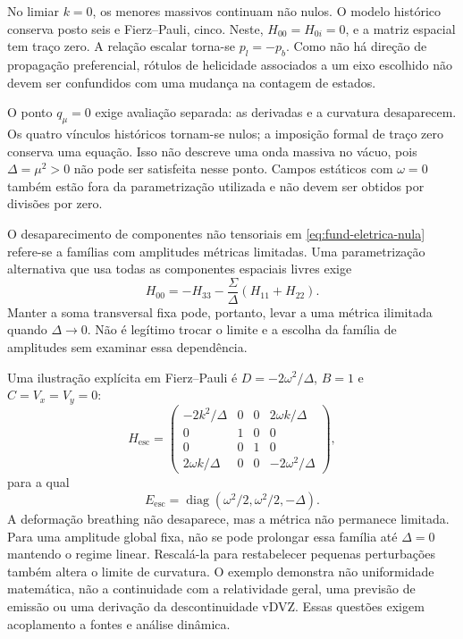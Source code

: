 No limiar \(k=0\), os menores massivos continuam não nulos. O
modelo histórico conserva posto seis e Fierz--Pauli, cinco. Neste,
\(H_{00}=H_{0i}=0\), e a matriz espacial tem traço zero. A relação
escalar torna-se \(p_l=-p_b\). Como não há direção de propagação
preferencial, rótulos de helicidade associados a um eixo escolhido não
devem ser confundidos com uma mudança na contagem de estados.

O ponto \(q_\mu=0\) exige avaliação separada: as derivadas e a
curvatura desaparecem. Os quatro vínculos históricos tornam-se
nulos; a imposição formal de traço zero conserva uma equação. Isso
não descreve uma onda massiva no vácuo, pois
\(\Delta=\mu^2>0\) não pode ser satisfeita nesse ponto. Campos
estáticos com \(\omega=0\) também estão fora da parametrização
utilizada e não devem ser obtidos por divisões por zero.

O desaparecimento de componentes não tensoriais em
\eqref{eq:fund-eletrica-nula} refere-se a famílias com amplitudes
métricas limitadas. Uma parametrização alternativa que usa todas as
componentes espaciais livres exige
\begin{equation}
 H_{00}=-H_{33}-\frac{\Sigma}{\Delta}(H_{11}+H_{22}).
 \label{eq:fund-parametrizacao-singular}
\end{equation}
Manter a soma transversal fixa pode, portanto, levar a uma métrica
ilimitada quando \(\Delta\to0\). Não é legítimo trocar o limite
e a escolha da família de amplitudes sem examinar essa dependência.

Uma ilustração explícita em Fierz--Pauli é
\(D=-2\omega^2/\Delta\), \(B=1\) e \(C=V_x=V_y=0\):
\begin{equation}
 H_{\mathrm{esc}}=\begin{pmatrix}
 -2k^2/\Delta&0&0&2\omega k/\Delta\\
 0&1&0&0\\
 0&0&1&0\\
 2\omega k/\Delta&0&0&-2\omega^2/\Delta
 \end{pmatrix},
 \label{eq:fund-familia-singular}
\end{equation}
para a qual
\begin{equation}
 E_{\mathrm{esc}}=\operatorname{diag}
       (\omega^2/2,\omega^2/2,-\Delta).
 \label{eq:fund-familia-curvatura}
\end{equation}
A deformação breathing não desaparece, mas a métrica não permanece
limitada. Para uma amplitude global fixa, não se pode prolongar essa
família até \(\Delta=0\) mantendo o regime linear. Rescalá-la para
restabelecer pequenas perturbações também altera o limite de
curvatura. O exemplo demonstra não uniformidade matemática, não a
continuidade com a relatividade geral, uma previsão de emissão ou uma
derivação da descontinuidade vDVZ. Essas questões exigem acoplamento a
fontes e análise dinâmica.

